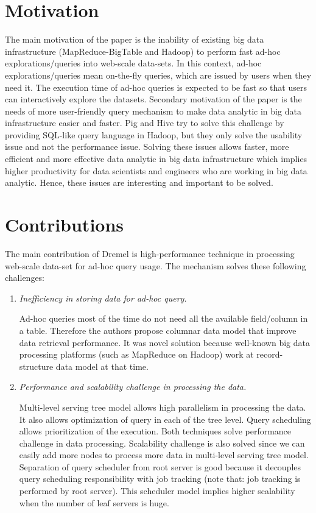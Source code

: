 \documentclass[twocolumn]{article}
\newcommand{\be}{\begin{enumerate}}
\newcommand{\ee}{\end{enumerate}}
\newcommand{\ii}{\item}
\begin{document}
\section{Motivation}

The main motivation of the paper is the inability of existing big data infrastructure (MapReduce-BigTable and Hadoop) to perform fast ad-hoc explorations/queries into web-scale data-sets. In this context, ad-hoc explorations/queries mean on-the-fly queries, which are issued by users when they need it. The execution time of ad-hoc queries is expected to be fast so that users can interactively explore the datasets.
Secondary motivation of the paper is the needs of more user-friendly query mechanism to make data analytic in big data infrastructure easier and faster. Pig and Hive try to solve this challenge by providing SQL-like query language in Hadoop, but they only solve the usability issue and not the performance issue.
Solving these issues allows faster, more efficient and more effective data analytic in big data infrastructure which implies higher productivity for data scientists and engineers who are working in big data analytic. Hence, these issues are interesting and important to be solved.

\section{Contributions}
The main contribution of Dremel is high-performance technique in processing web-scale data-set for 
ad-hoc query usage. The mechanism solves these following challenges:

\be
\ii \textit{Inefficiency in storing data for ad-hoc query.}

Ad-hoc queries most of the time do not need all the available field/column in a table. Therefore the authors propose columnar data model that improve data retrieval performance. It was novel solution because well-known big data processing platforms (such as MapReduce on Hadoop) work at record-structure data model at that time.

\ii \textit{Performance and scalability challenge in processing the data.}

Multi-level serving tree model allows high parallelism in processing the data. It also allows optimization of query in each of the tree level. Query scheduling allows prioritization of the execution. Both techniques solve performance challenge in data processing.
Scalability challenge is also solved since we can easily add more nodes to process more data in multi-level serving tree model. Separation of query scheduler from root server is good because it decouples query scheduling responsibility with job tracking (note that: job tracking is performed by root server). This scheduler model implies higher scalability when the number of leaf servers is huge.
\ee
\end{document}
